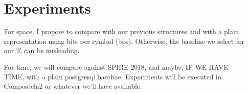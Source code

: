 \documentclass[runningheads]{llncs}
\newcommand{\ctr}{NewCTR (name subject to change)\ }
\begin{document}
\begin{algorithm}[H]
 
 
 \caption{Querying for all features on \ctr where ,  and  are structures (i), (ii) and (iii), respectively}
\end{algorithm}


\section{Experiments}
For space, I propose to compare with our previous structures and with a plain representation using bits per symbol (bps). Otherwise, the baseline we select for our $\%$ can be misleading.

For time, we will compare against SPIRE 2018, and maybe, IF WE HAVE TIME, with a plain postgresql baseline. Experiments will be executed in Compostela2 or whatever we'll have available.
\end{document}

